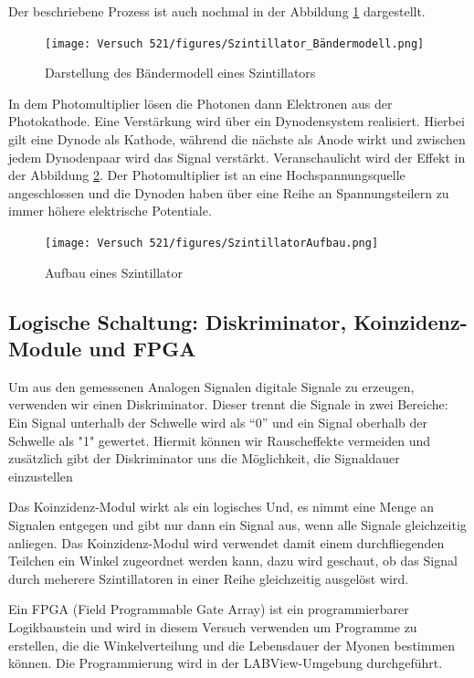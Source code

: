 \documentclass{article}
\begin{document}
Der beschriebene Prozess ist auch nochmal in der Abbildung \ref{fig:SzintillatorBandlücke} dargestellt.


\begin{figure}
    \centering
    \texttt{[image: Versuch 521/figures/Szintillator\_Bändermodell.png]}
    \caption{Darstellung des Bändermodell eines Szintillators \cite{Wer}}
    \label{fig:SzintillatorBandlücke}
\end{figure}

In dem Photomultiplier lösen die Photonen dann Elektronen aus der Photokathode. Eine Verstärkung wird über ein Dynodensystem realisiert. Hierbei gilt eine Dynode als Kathode, während die nächste als Anode wirkt und zwischen jedem Dynodenpaar wird das Signal verstärkt. Veranschaulicht wird der Effekt in der Abbildung \ref{fig:AufbauSzinti}. Der Photomultiplier ist an eine Hochspannungsquelle angeschlossen und die Dynoden haben über eine Reihe an Spannungsteilern zu immer höhere elektrische Potentiale.

\begin{figure}[H]
    \centering
    \texttt{[image: Versuch 521/figures/SzintillatorAufbau.png]}
    \caption{Aufbau eines Szintillator \cite{Wer}}
    \label{fig:AufbauSzinti}
\end{figure}

\subsection{Logische Schaltung: Diskriminator, Koinzidenz-Module und FPGA}
Um aus den gemessenen Analogen Signalen digitale Signale zu erzeugen, verwenden wir einen Diskriminator. 
Dieser trennt die Signale in zwei Bereiche: Ein Signal unterhalb der Schwelle wird als \enquote{0} und ein Signal oberhalb der Schwelle als "1" gewertet. 
Hiermit können wir Rauscheffekte vermeiden und zusätzlich gibt der Diskriminator uns die Möglichkeit, die Signaldauer einzustellen

Das Koinzidenz-Modul wirkt als ein logisches Und, es nimmt eine Menge an Signalen entgegen und gibt nur dann ein Signal aus, 
wenn alle Signale gleichzeitig anliegen. Das Koinzidenz-Modul wird verwendet damit einem durchfliegenden Teilchen ein Winkel zugeordnet werden kann, 
dazu wird geschaut, ob das Signal durch meherere Szintillatoren in einer Reihe gleichzeitig ausgelöst wird.

Ein FPGA (Field Programmable Gate Array) ist ein programmierbarer Logikbaustein und wird in diesem Versuch verwenden um Programme zu erstellen, die die Winkelverteilung
und die Lebensdauer der Myonen bestimmen können.
Die Programmierung wird in der LABView-Umgebung durchgeführt.
\end{document}
